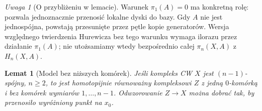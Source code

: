 \documentclass[11pt,a4paper,oneside]{report}
\theoremstyle{plain}
\newtheorem{lemat}[twierdzenie]{Lemat}
\theoremstyle{definition}
\theoremstyle{remark}
\newtheorem{uwaga}[twierdzenie]{Uwaga}
\begin{document}
\begin{uwaga}[O przybliżeniu w lemacie]
Warunek $\pi_1(A)=0$ ma
konkretną rolę: pozwala
jednoznacznie przenosić
lokalne dyski do bazy.
Gdy $A$ nie jest
jednospójna, powstają
przesunięte przez pętle
kopie generatorów.
Wersja względnego
twierdzenia Hurewicza
bez tego warunku
wymaga ilorazu przez
działanie $\pi_1(A)$;
nie utożsamiamy wtedy
bezpośrednio całej
$\pi_n(X,A)$ z
$H_n(X,A)$.
\end{uwaga}

\begin{lemat}[Model bez niższych komórek]
\label{lem:model-wysoko-spojny}
Jeśli kompleks CW $X$
jest $(n-1)$-spójny,
$n\geq2$, to jest
homotopijnie równoważny
kompleksowi $Z$ z
jedną $0$-komórką
i bez komórek
wymiarów $1,\ldots,n-1$.
Odwzorowanie $Z\to X$
można dobrać tak,
by przenosiło
wyróżniony punkt
na $x_0$.
\end{lemat}
\end{document}
